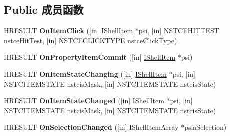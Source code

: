\subsection*{Public 成员函数}
\begin{DoxyCompactItemize}
\item 
\mbox{\label{interface_i_name_space_tree_control_events_ac9141c56da5ef41b1208a96643d44783}} 
H\+R\+E\+S\+U\+LT {\bfseries On\+Item\+Click} (\mbox{[}in\mbox{]} \hyperlink{interface_i_shell_item}{I\+Shell\+Item} $\ast$psi, \mbox{[}in\mbox{]} N\+S\+T\+C\+E\+H\+I\+T\+T\+E\+ST nstce\+Hit\+Test, \mbox{[}in\mbox{]} N\+S\+T\+C\+E\+C\+L\+I\+C\+K\+T\+Y\+PE nstce\+Click\+Type)
\item 
\mbox{\label{interface_i_name_space_tree_control_events_ab18072bdb38b9d0f58ba7bdf3f2f38e2}} 
H\+R\+E\+S\+U\+LT {\bfseries On\+Property\+Item\+Commit} (\mbox{[}in\mbox{]} \hyperlink{interface_i_shell_item}{I\+Shell\+Item} $\ast$psi)
\item 
\mbox{\label{interface_i_name_space_tree_control_events_a3c5c563daeae08a342f5e163793ef96f}} 
H\+R\+E\+S\+U\+LT {\bfseries On\+Item\+State\+Changing} (\mbox{[}in\mbox{]} \hyperlink{interface_i_shell_item}{I\+Shell\+Item} $\ast$psi, \mbox{[}in\mbox{]} N\+S\+T\+C\+I\+T\+E\+M\+S\+T\+A\+TE nstcis\+Mask, \mbox{[}in\mbox{]} N\+S\+T\+C\+I\+T\+E\+M\+S\+T\+A\+TE nstcis\+State)
\item 
\mbox{\label{interface_i_name_space_tree_control_events_ae4184185778143e073c49ea23fcce1fe}} 
H\+R\+E\+S\+U\+LT {\bfseries On\+Item\+State\+Changed} (\mbox{[}in\mbox{]} \hyperlink{interface_i_shell_item}{I\+Shell\+Item} $\ast$psi, \mbox{[}in\mbox{]} N\+S\+T\+C\+I\+T\+E\+M\+S\+T\+A\+TE nstcis\+Mask, \mbox{[}in\mbox{]} N\+S\+T\+C\+I\+T\+E\+M\+S\+T\+A\+TE nstcis\+State)
\item 
\mbox{\label{interface_i_name_space_tree_control_events_a80be13988f12e8b3b490a68061bbc8e3}} 
H\+R\+E\+S\+U\+LT {\bfseries On\+Selection\+Changed} (\mbox{[}in\mbox{]} I\+Shell\+Item\+Array $\ast$psia\+Selection)
\item 
\mbox{\label{interface_i_name_space_tree_control_events_ab3bb3f71e43542d860488cbf962a883a}} 

\end{DoxyCompactItemize}
